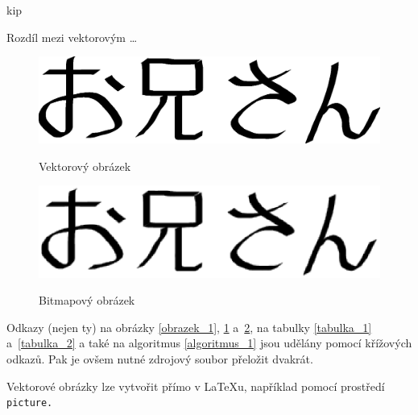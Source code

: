 \documentclass[a4paper, 11pt]{article}
\begin{document}
kip
\pagebreak

Rozdíl mezi vektorovým \dots
\begin{figure}[h]
    \centering
    \scalebox{0.4}
        { \includegraphics{oniisan.eps} }
    \caption{Vektorový obrázek}
    \label{obrazek_2}
\end{figure}
\bigskip

\begin{figure}[h]
    \centering
    \scalebox{0.6}
        { \includegraphics{oniisan2.eps} }
    \caption{Bitmapový obrázek}
    \label{obrazek_3}
\end{figure}
\bigskip


Odkazy (nejen ty) na obrázky \ref{obrazek_1}, \ref{obrazek_2} a~\ref{obrazek_3},
na tabulky \ref{tabulka_1} a~\ref{tabulka_2} a také na algoritmus \ref{algoritmus_1}
jsou udělány pomocí křížových odkazů. Pak je ovšem nutné zdrojový soubor přeložit dvakrát.

Vektorové obrázky lze vytvořit přímo v \LaTeX u, například pomocí prostředí\verb| picture.|
\end{document}
